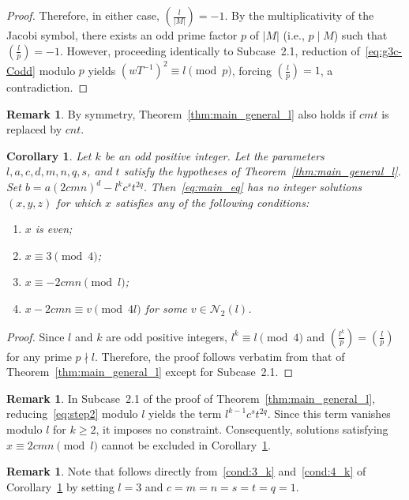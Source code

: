 \documentclass[11pt,a4paper]{amsart}
\theoremstyle{plain}
\newtheorem{corollary}[theorem]{Corollary}
\theoremstyle{definition}
\newtheorem{remark}[theorem]{Remark}
\begin{document}
\begin{proof}
Therefore, in either case, $\left(\frac{l}{|M|}\right) = -1$. By the multiplicativity of the Jacobi symbol, there exists an odd prime factor $p$ of $ |M|$ (i.e., $p \mid M$) such that $\left(\frac{l}{p}\right) = -1$. However, proceeding identically to Subcase~2.1, reduction of~\eqref{eq:g3c-Codd} modulo $p$ yields $(wT^{-1})^2 \equiv l \pmod p$, forcing $\left(\frac{l}{p}\right) = 1$, a contradiction.
\end{proof}
\begin{remark}
By symmetry, Theorem~\ref{thm:main_general_l} also holds if $cmt$ is replaced by $cnt$.
\end{remark}
\begin{corollary}\label{thm:main_general_l_k}
Let $k$ be an odd positive integer. Let the parameters $l, a, c, d, m, n, q, s$, and $t$ satisfy the hypotheses of Theorem~\ref{thm:main_general_l}. Set $b = a (2 c m n)^{d} - l^{k} c^{s} t^{2q}.$ Then~\eqref{eq:main_eq} has no integer solutions $(x,y,z)$ for which $x$ satisfies any of the following conditions:
\begin{enumerate}[label=(\alph*)]
    \item $x$ is even; \label{cond:1_k}
    \item $x \equiv 3 \pmod 4$; \label{cond:2_k}
    \item $x \equiv -2cmn \pmod l$; \label{cond:3_k}
    \item $x - 2cmn \equiv v \pmod{4l}$ for some $v \in \mathcal{N}_2(l)$. \label{cond:4_k}
\end{enumerate}
\end{corollary}
\begin{proof}
Since $l$ and $k$ are odd positive integers, $l^k \equiv l \pmod{4}$ and $\left(\frac{l^k}{p}\right) = \left(\frac{l}{p}\right)$ for any prime $p \nmid l$. Therefore, the proof follows verbatim from that of Theorem~\ref{thm:main_general_l} except for Subcase~2.1.
\end{proof}
\begin{remark}
    In Subcase~2.1 of the proof of Theorem~\ref{thm:main_general_l}, reducing~\eqref{eq:step2} modulo $l$ yields the term $l^{k-1}c^s t^{2q}$. Since this term vanishes modulo $l$ for $k \ge 2$, it imposes no constraint. Consequently, solutions satisfying $x \equiv 2cmn \pmod{l}$ cannot be excluded in Corollary~\ref{thm:main_general_l_k}.
\end{remark}
\begin{remark}
    Note that \cite[Corollary~2.2]{PrakashChakraborty} follows directly from~\ref{cond:3_k} and~\ref{cond:4_k} of Corollary~\ref{thm:main_general_l_k} by setting $l=3$ and $c=m=n=s=t=q=1$. 
\end{remark}
\end{document}
